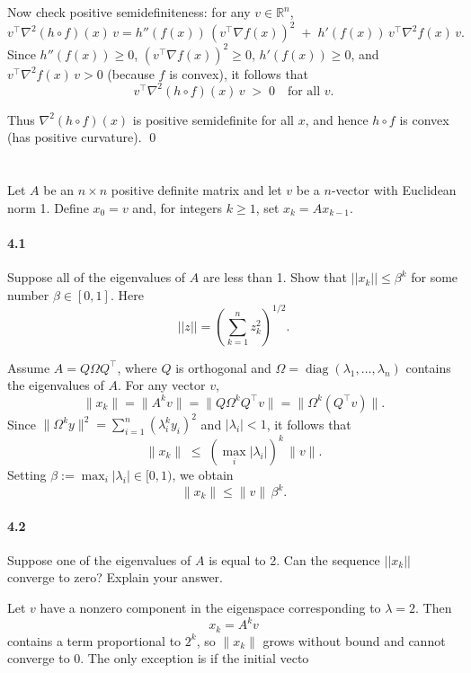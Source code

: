 \documentclass[a4paper]{article}
\begin{document}
Now check positive semidefiniteness: for any $v \in \mathbb{R}^n$,
\[
v^\top \nabla^2 (h\circ f)(x)\, v
= h''(f(x))\, (v^\top \nabla f(x))^2 \;+\; h'(f(x))\, v^\top \nabla^2 f(x)\, v.
\]
Since $h''(f(x)) \ge 0$, $(v^\top \nabla f(x))^2 \ge 0$, $h'(f(x)) \ge 0$, and $v^\top \nabla^2 f(x)\, v > 0$ (because $f$ is convex), it follows that
\[
v^\top \nabla^2 (h\circ f)(x)\, v \; >\; 0 \quad \text{for all } v.
\]

Thus $\nabla^2 (h\circ f)(x)$ is positive semidefinite for all $x$, and hence $h\circ f$ is convex (has positive curvature).
\qed

\section{}
Let $A$ be an $n \times n$ positive definite matrix and let $v$ be a $n$-vector with Euclidean norm 1.
Define $x_0 = v$ and, for integers $k \geq 1$, set $x_k = Ax_{k-1}.$
\paragraph{4.1}
Suppose all of the eigenvalues of $A$ are less than 1.
Show that $||x_k || \leq \beta^k$ for some number $\beta \in [0, 1]$.
Here
$$||z|| = \left( \sum_{k=1}^n z_k^2 \right)^{1/2}.$$

Assume $A = Q \Omega Q^\top$, where $Q$ is orthogonal and $\Omega = \operatorname{diag}(\lambda_1,\dots,\lambda_n)$ contains the eigenvalues of $A$.
For any vector $v$,
\[
\|x_k\| = \|A^k v\| = \|Q \Omega^k Q^\top v\| = \|\Omega^k (Q^\top v)\|.
\]
Since $\|\Omega^k y\|^2 = \sum_{i=1}^n (\lambda_i^k y_i)^2$ and $|\lambda_i| < 1$, it follows that
\[
\|x_k\| \;\le\; (\max_i |\lambda_i|)^k \,\|v\|.
\]
Setting $\beta := \max_i |\lambda_i| \in [0,1)$, we obtain
\[
\|x_k\| \le \|v\|\, \beta^k.
\]

\paragraph{4.2}
Suppose one of the eigenvalues of $A$ is equal to 2.
Can the sequence $||x_k||$ converge to zero?
Explain your answer.

Let $v$ have a nonzero component in the eigenspace corresponding to $\lambda=2$. Then
\[
x_k = A^k v
\]
contains a term proportional to $2^k$, so $\|x_k\|$ grows without bound and cannot converge to $0$.
The only exception is if the initial vecto
\end{document}
